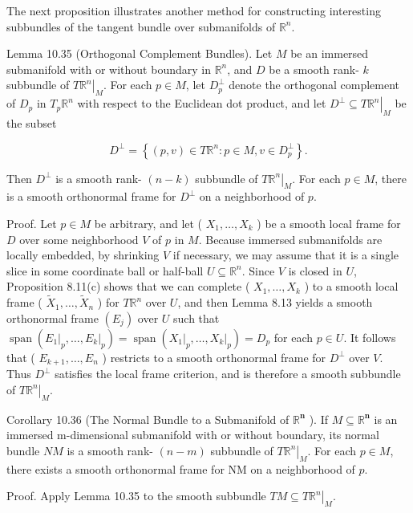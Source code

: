 \documentclass[10pt, letterpaper]{article}
\begin{document}
The next proposition illustrates another method for constructing interesting subbundles of the tangent bundle over submanifolds of $\mathbb{R}^{n}$.

Lemma 10.35 (Orthogonal Complement Bundles). Let $M$ be an immersed submanifold with or without boundary in $\mathbb{R}^{n}$, and $D$ be a smooth rank- $k$ subbundle of $\left.T \mathbb{R}^{n}\right|_{M}$. For each $p \in M$, let $D_{p}^{\perp}$ denote the orthogonal complement of $D_{p}$ in $T_{p} \mathbb{R}^{n}$ with respect to the Euclidean dot product, and let $\left.D^{\perp} \subseteq T \mathbb{R}^{n}\right|_{M}$ be the subset

$$
D^{\perp}=\left\{(p, v) \in T \mathbb{R}^{n}: p \in M, v \in D_{p}^{\perp}\right\} .
$$

Then $D^{\perp}$ is a smooth rank- $(n-k)$ subbundle of $\left.T \mathbb{R}^{n}\right|_{M}$. For each $p \in M$, there is a smooth orthonormal frame for $D^{\perp}$ on a neighborhood of $p$.

Proof. Let $p \in M$ be arbitrary, and let ( $X_{1}, \ldots, X_{k}$ ) be a smooth local frame for $D$ over some neighborhood $V$ of $p$ in $M$. Because immersed submanifolds are locally embedded, by shrinking $V$ if necessary, we may assume that it is a single slice in some coordinate ball or half-ball $U \subseteq \mathbb{R}^{n}$. Since $V$ is closed in $U$, Proposition 8.11(c) shows that we can complete ( $X_{1}, \ldots, X_{k}$ ) to a smooth local frame ( $\widetilde{X}_{1}, \ldots, \widetilde{X}_{n}$ ) for $T \mathbb{R}^{n}$ over $U$, and then Lemma 8.13 yields a smooth orthonormal frame $\left(E_{j}\right)$ over $U$ such that $\operatorname{span}\left(\left.E_{1}\right|_{p}, \ldots,\left.E_{k}\right|_{p}\right)=\operatorname{span}\left(\left.X_{1}\right|_{p}, \ldots,\left.X_{k}\right|_{p}\right)=D_{p}$ for each $p \in U$. It follows that ( $E_{k+1}, \ldots, E_{n}$ ) restricts to a smooth orthonormal frame for $D^{\perp}$ over $V$. Thus $D^{\perp}$ satisfies the local frame criterion, and is therefore a smooth subbundle of $\left.T \mathbb{R}^{n}\right|_{M}$.

Corollary 10.36 (The Normal Bundle to a Submanifold of $\mathbb{R}^{\boldsymbol{n}}$ ). If $M \subseteq \mathbb{R}^{\boldsymbol{n}}$ is an immersed m-dimensional submanifold with or without boundary, its normal bundle $N M$ is a smooth rank- $(n-m)$ subbundle of $\left.T \mathbb{R}^{n}\right|_{M}$. For each $p \in M$, there exists a smooth orthonormal frame for NM on a neighborhood of $p$.

Proof. Apply Lemma 10.35 to the smooth subbundle $\left.T M \subseteq T \mathbb{R}^{n}\right|_{M}$.
\end{document}
